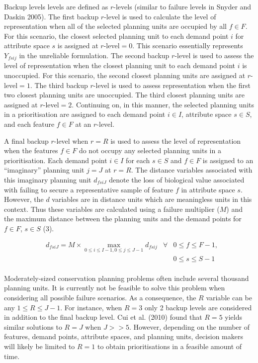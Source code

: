 \documentclass[11pt,]{article}
\begin{document}
Backup levels levels are defined as $r$-levels (similar to failure
levels in Snyder and Daskin 2005). The first backup $r$-level is used to
calculate the level of representation when all of the selected planning
units are occupied by all $f \in F$. For this scenario, the closest
selected planning unit to each demand point $i$ for attribute space $s$
is assigned at $r$-level$=0$. This scenario essentially represents
$Y_{fsij}$ in the unreliable formulation. The second backup $r$-level is
used to assess the level of representation when the closest planning
unit to each demand point $i$ is unoccupied. For this scenario, the
second closest planning units are assigned at $r$-level$=1$. The third
backup $r$-level is used to assess representation when the first two
closest planning units are unoccupied. The third closest planning units
are assigned at $r$-level$=2$. Continuing on, in this manner, the
selected planning units in a prioritisation are assigned to each demand
point $i \in I$, attribute space $s \in S$, and each feature $f \in F$
at an $r$-level.

A final backup $r$-level when $r=R$ is used to assess the level of
representation when the features $f \in F$ do not occupy any selected
planning units in a prioritisation. Each demand point $i \in I$ for each
$s \in S$ and $f \in F$ is assigned to an ``imaginary'' planning unit
$j=J$ at $r=R$. The distance variables associated with this imaginary
planning unit $d_{fsiJ}$ denote the loss of biological value associated
with failing to secure a representative sample of feature $f$ in
attribute space $s$. However, the $d$ variables are in distance units
which are meaningless units in this context. Thus these variables are
calculated using a failure multiplier ($M$) and the maximum distance
between the planning units and the demand points for $f \in F$,
$s \in S$ (3).

\begin{align*}
& d_{fsiJ} = M \times \max\limits_{0 \leq i \leq I-1, 0 \leq j \leq J-1} d_{fsij} & \forall & 0 \leq f \leq F-1, \tag{3} \\
& & & 0 \leq s \leq S-1\\
\end{align*}

Moderately-sized conservation planning problems often include several
thousand planning units. It is currently not be feasible to solve this
problem when considering all possible failure scenarios. As a
consequence, the $R$ variable can be any $1 \leq R \leq J-1$. For
instance, when $R=3$ only 2 backup levels are considered in addition to
the final backup level. Cui et al. (2010) found that $R=5$ yields
similar solutions to $R=J$ when $J >> 5$. However, depending on the
number of features, demand points, attribute spaces, and planning units,
decision makers will likely be limited to $R=1$ to obtain
prioritisations in a feasible amount of time.
\end{document}
